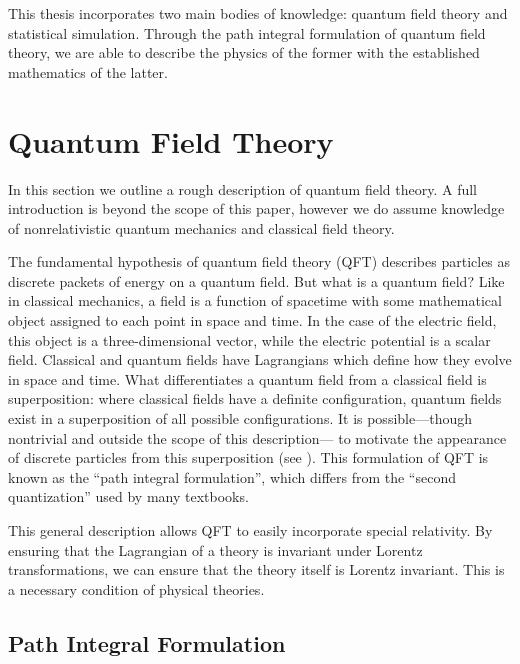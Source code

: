 This thesis incorporates two main bodies of knowledge: quantum field theory and statistical simulation. Through the path integral formulation of quantum field theory, we are able to describe the physics of the former with the established mathematics of the latter.

\section{Quantum Field Theory}


In this section we outline a rough description of quantum field theory. A full introduction is beyond the scope of this paper, however we do assume knowledge of nonrelativistic quantum mechanics and classical field theory.

The fundamental hypothesis of quantum field theory (QFT) describes particles as discrete packets of energy on a quantum field. But what is a quantum field? Like in classical mechanics, a field is a function of spacetime with some mathematical object assigned to each point in space and time. In the case of the electric field, this object is a three-dimensional vector, while the electric potential is a scalar field. Classical and quantum fields have Lagrangians which define how they evolve in space and time. What differentiates a quantum field from a classical field is superposition: where classical fields have a definite configuration, quantum fields exist in a superposition of all possible configurations. It is possible---though nontrivial and outside the scope of this description--- to motivate the appearance of discrete particles from this superposition (see \cite{zee2010}). This formulation of QFT is known as the ``path integral formulation'', which differs from the ``second quantization'' used by many textbooks.

This general description allows QFT to easily incorporate special relativity. By ensuring that the Lagrangian of a theory is invariant under Lorentz transformations, we can ensure that the theory itself is Lorentz invariant. This is a necessary condition of physical theories. 

 
\subsection{Path Integral Formulation}
\label{sec:pathintegral}

